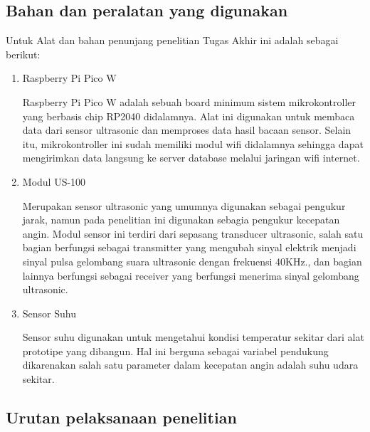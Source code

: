 \subsection{Bahan dan peralatan yang digunakan}

Untuk Alat dan bahan penunjang penelitian Tugas Akhir ini adalah sebagai berikut:
\begin{enumerate}
  \item Raspberry Pi Pico W
  
  Raspberry Pi Pico W adalah sebuah board minimum sistem mikrokontroller yang berbasis chip RP2040 didalamnya. 
  Alat ini digunakan untuk membaca data dari sensor ultrasonic dan memproses data hasil bacaan sensor. Selain itu, 
  mikrokontroller ini sudah memiliki modul wifi didalamnya sehingga dapat mengirimkan data langsung ke server database 
  melalui jaringan wifi internet.

  \item Modul US-100
  
  Merupakan sensor ultrasonic yang umumnya digunakan sebagai pengukur jarak, namun pada penelitian ini digunakan sebagia
  pengukur kecepatan angin. Modul sensor ini terdiri dari sepasang transducer ultrasonic, salah satu bagian berfungsi sebagai 
  transmitter yang mengubah sinyal elektrik menjadi sinyal pulsa gelombang suara ultrasonic dengan frekuensi 40KHz., dan bagian lainnya 
  berfungsi sebagai receiver yang berfungsi menerima sinyal gelombang ultrasonic.
  \item Sensor Suhu
  
  Sensor suhu digunakan untuk mengetahui kondisi temperatur sekitar dari alat prototipe yang dibangun. Hal ini berguna sebagai variabel 
  pendukung dikarenakan salah satu parameter dalam kecepatan angin adalah suhu udara sekitar.
\end{enumerate}

\subsection{Urutan pelaksanaan penelitian}

